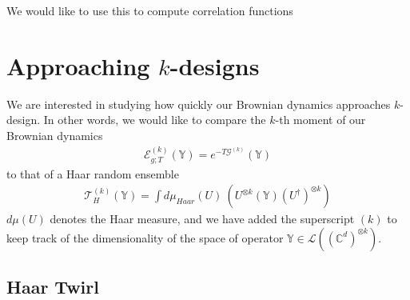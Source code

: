 \documentclass{article}
\theoremstyle{definition}
\newcommand{\lb}{\left(}
\newcommand{\rb}{\right)}
\newcommand{\NL}[1]{\textcolor{blue}{#1}}
\begin{document}
    We would like to use this to compute correlation functions




    \section{Approaching \texorpdfstring{$k$}{k}-designs}

    We are interested in studying how quickly our Brownian dynamics approaches
    $k$-design. In other words, we would like to compare the $k$-th moment of
    our Brownian dynamics
    \begin{eqnarray}
        \mathcal{E}^{(k)}_{g;T}(\mathbb{Y})=e^{-T\mathcal{G}^{(k)}}(\mathbb{Y})
    \end{eqnarray}
    to that of a Haar random ensemble
    \begin{eqnarray}
        \mathcal{T}_H^{(k)}(\mathbb{Y})=\int d\mu_{Haar}(U)\:\lb U^{\otimes k}(\mathbb{Y})(U^\dagger)^{\otimes k}\rb
    \end{eqnarray}
    $d\mu(U)$ denotes the Haar measure, and we have added the superscript $(k)$ to
    keep track of the dimensionality of the space of operator $\mathbb{Y}\in \mathcal{L}
    ((\mathbb{C}^{d})^{\otimes k})$.

    \subsection{Haar Twirl}
    \label{subsec:haar_twirl}
\end{document}
